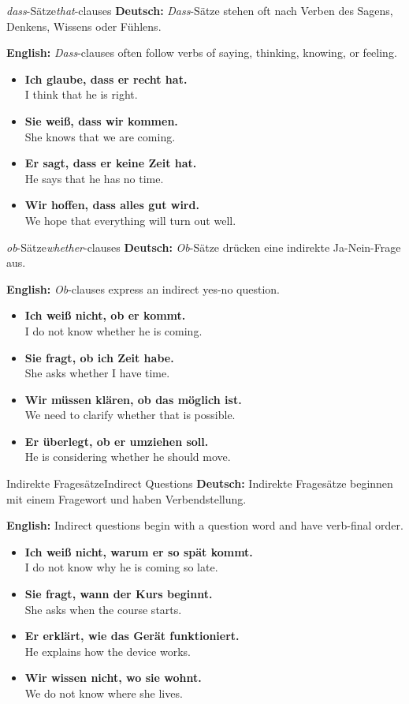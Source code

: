 \documentclass[a4paper,11pt]{article}
\newcommand{\GermanText}[1]{\textbf{Deutsch: }#1\par}
\newcommand{\EnglishText}[1]{{\color{SoftGray}\textbf{English: }#1\par}}
\newcommand{\ExampleItem}[2]{\item \textbf{#1}\\{\color{SoftGray}#2}}
\begin{document}
\begin{grammarentry}{\textit{dass}-Sätze}{\textit{that}-clauses}
    \GermanText{\textit{Dass}-Sätze stehen oft nach Verben des Sagens, Denkens, Wissens oder Fühlens.}
    \EnglishText{\textit{Dass}-clauses often follow verbs of saying, thinking, knowing, or feeling.}
    \begin{exbox}
        \begin{itemize}
            \ExampleItem{Ich glaube, dass er recht hat.}{I think that he is right.}
            \ExampleItem{Sie weiß, dass wir kommen.}{She knows that we are coming.}
            \ExampleItem{Er sagt, dass er keine Zeit hat.}{He says that he has no time.}
            \ExampleItem{Wir hoffen, dass alles gut wird.}{We hope that everything will turn out well.}
        \end{itemize}
    \end{exbox}
\end{grammarentry}

\begin{grammarentry}{\textit{ob}-Sätze}{\textit{whether}-clauses}
    \GermanText{\textit{Ob}-Sätze drücken eine indirekte Ja-Nein-Frage aus.}
    \EnglishText{\textit{Ob}-clauses express an indirect yes-no question.}
    \begin{exbox}
        \begin{itemize}
            \ExampleItem{Ich weiß nicht, ob er kommt.}{I do not know whether he is coming.}
            \ExampleItem{Sie fragt, ob ich Zeit habe.}{She asks whether I have time.}
            \ExampleItem{Wir müssen klären, ob das möglich ist.}{We need to clarify whether that is possible.}
            \ExampleItem{Er überlegt, ob er umziehen soll.}{He is considering whether he should move.}
        \end{itemize}
    \end{exbox}
\end{grammarentry}

\begin{grammarentry}{Indirekte Fragesätze}{Indirect Questions}
    \GermanText{Indirekte Fragesätze beginnen mit einem Fragewort und haben Verbendstellung.}
    \EnglishText{Indirect questions begin with a question word and have verb-final order.}
    \begin{exbox}
        \begin{itemize}
            \ExampleItem{Ich weiß nicht, warum er so spät kommt.}{I do not know why he is coming so late.}
            \ExampleItem{Sie fragt, wann der Kurs beginnt.}{She asks when the course starts.}
            \ExampleItem{Er erklärt, wie das Gerät funktioniert.}{He explains how the device works.}
            \ExampleItem{Wir wissen nicht, wo sie wohnt.}{We do not know where she lives.}
        \end{itemize}
    \end{exbox}
\end{grammarentry}
\end{document}
